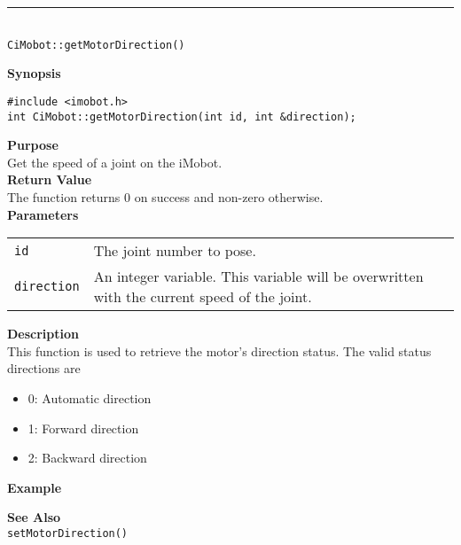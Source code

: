 \noindent
\vspace{5pt}
\rule{4.5in}{0.015in}\\
\noindent
{\LARGE \texttt{CiMobot::getMotorDirection()}}\\
{}

\noindent
{\bf Synopsis}\\
\begin{verbatim}
#include <imobot.h>
int CiMobot::getMotorDirection(int id, int &direction);
\end{verbatim}

\noindent
{\bf Purpose}\\
Get the speed of a joint on the iMobot.\\

\noindent
{\bf Return Value}\\
The function returns 0 on success and non-zero otherwise.\\

\noindent
{\bf Parameters}
\vspace{-0.1in}
\begin{description}
\item               
\begin{tabular}{p{20 mm}p{145 mm}}
\texttt{id} & The joint number to pose. \\
\texttt{direction} & An integer variable. This variable will be overwritten
with the current speed of the joint.
\end{tabular}
\end{description}

\noindent
{\bf Description}\\
This function is used to retrieve the motor's direction status. The valid
status directions are
\begin{itemize}
\item 0: Automatic direction
\item 1: Forward direction
\item 2: Backward direction
\end{itemize}

\noindent
{\bf Example}\\
\noindent

\noindent
{\bf See Also}\\
\texttt{setMotorDirection()}


